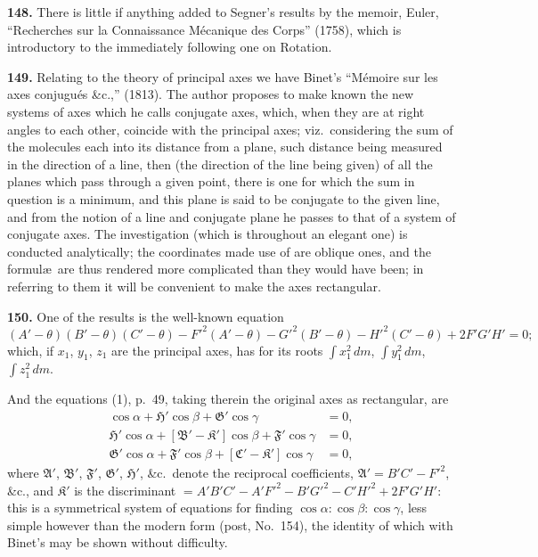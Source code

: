 \documentclass[11pt,a4paper]{book}
\begin{document}
\textbf{148.} There is little if anything added to Segner's results by the memoir, Euler, ``Recherches sur la Connaissance M\'ecanique des Corps'' (1758), which is introductory to the immediately following one on Rotation.

\textbf{149.} Relating to the theory of principal axes we have Binet's ``M\'emoire sur les axes conjugu\'es \&c.,'' (1813). The author proposes to make known the new systems of axes which he calls conjugate axes, which, when they are at right angles to each other, coincide with the principal axes; viz.\ considering the sum of the molecules each into its distance from a plane, such distance being measured in the direction of a line, then (the direction of the line being given) of all the planes which pass through a given point, there is one for which the sum in question is a minimum, and this plane is said to be conjugate to the given line, and from the notion of a line and conjugate plane he passes to that of a system of conjugate axes. The investigation (which is throughout an elegant one) is conducted analytically; the coordinates made use of are oblique ones, and the formul\ae\ are thus rendered more complicated than they would have been; in referring to them it will be convenient to make the axes rectangular.

\textbf{150.} One of the results is the well-known equation
\[
(A' - \theta)(B' - \theta)(C' - \theta) - F'^2(A' - \theta) - G'^2(B' - \theta) - H'^2(C' - \theta) + 2F'G'H' = 0;
\]
which, if $x_1$, $y_1$, $z_1$ are the principal axes, has for its roots $\int x_1^2\,dm$, $\int y_1^2\,dm$, $\int z_1^2\,dm$.

And the equations (1), p.~49, taking therein the original axes as rectangular, are
\begin{align*}
[\mathfrak{A}' - \mathfrak{K}']\cos\alpha + \mathfrak{H}'\cos\beta + \mathfrak{G}'\cos\gamma &= 0, \\
\mathfrak{H}'\cos\alpha + [\mathfrak{B}' - \mathfrak{K}']\cos\beta + \mathfrak{F}'\cos\gamma &= 0, \\
\mathfrak{G}'\cos\alpha + \mathfrak{F}'\cos\beta + [\mathfrak{C}' - \mathfrak{K}']\cos\gamma &= 0,
\end{align*}
where $\mathfrak{A}'$, $\mathfrak{B}'$, $\mathfrak{F}'$, $\mathfrak{G}'$, $\mathfrak{H}'$, \&c.\ denote the reciprocal coefficients, $\mathfrak{A}' = B'C' - F'^2$, \&c., and $\mathfrak{K}'$ is the discriminant $= A'B'C' - A'F'^2 - B'G'^2 - C'H'^2 + 2F'G'H'$: this is a symmetrical system of equations for finding $\cos\alpha : \cos\beta : \cos\gamma$, less simple however than the modern form (post, No.~154), the identity of which with Binet's may be shown without difficulty.
\end{document}
